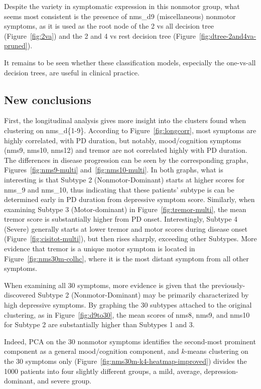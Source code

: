 \documentclass[preprint,3p,twocolumn]{elsarticle} %
\begin{document}
Despite the variety in symptomatic expression in this nonmotor group, what
seems most consistent is the presence of nms\_d9 (miscellaneous) nonmotor
symptoms, as it is used as the root node of the 2 vs all decision tree
(Figure~\ref{fig:2va}) and the 2 and 4 vs rest decision tree
(Figure~\ref{fig:dtree-2and4va-pruned}).

It remains to be seen whether these classification models, especially the one-vs-all decision
trees, are useful in clinical practice.

\subsection{New conclusions}
\label{ssec:newconc}

First, the longitudinal analysis gives more insight into the clusters found when clustering on
nms\_d\{1-9\}. According to Figure~\ref{fig:longcorr}, most symptoms are highly correlated, with PD
duration, but notably, mood/cognition symptoms (nms9, nms10, nms12) and tremor are not correlated
highly with PD duration. The differences in disease progression can be seen by the corresponding
graphs, Figures~\ref{fig:nms9-multi} and~\ref{fig:nms10-multi}. In both graphs, what is interesting
is that Subtype 2 (Nonmotor-Dominant) starts at higher scores for nms\_9 and nms\_10, thus
indicating that these patients' subtype is can be determined early in PD duration from depressive
symptom score. Similarly, when examining Subtype 3 (Motor-dominant) in
Figure~\ref{fig:tremor-multi}, the mean tremor score is substantially higher from PD onset.
Interestingly, Subtype 4 (Severe) generally starts at lower tremor and motor scores during disease
onset (Figure~\ref{fig:cisitot-multi}), but then rises sharply, exceeding other Subtypes. More evidence
that tremor is a unique motor symptom is located in Figure~\ref{fig:nms30m-colhc}, where it is the most
distant symptom from all other symptoms.

When examining all 30 symptoms, more evidence is given that the previously-discovered Subtype
2 (Nonmotor-Dominant) may be primarily characterized by high depressive symptoms. By graphing the
30 subtypes attached to the original clustering, as in Figure~\ref{fig:d9to30}, the mean scores of
nms8, nms9, and nms10 for Subtype 2 are substantially higher than Subtypes 1 and 3.

Indeed, PCA on the 30 nonmotor symptoms identifies the second-most prominent component as a general
mood/cognition component, and $k$-means clustering on the 30 symptoms only
(Figure~\ref{fig:nms30m-k4-heatmap-improved}) divides the 1000 patients into four slightly
different groups, a mild, average, depression-dominant, and severe group.
\end{document}
